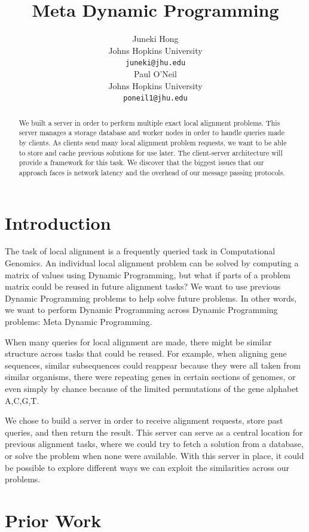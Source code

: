 \documentclass[12pt]{article}
\title{Meta Dynamic Programming}
\author{Juneki Hong \\
  Johns Hopkins University \\
  {\tt juneki@jhu.edu} \\\And
  Paul O'Neil \\
  Johns Hopkins University \\
  {\tt poneil1@jhu.edu} \\}
\date{}
\begin{document}
\maketitle
\begin{abstract}
  We built a server in order to perform multiple exact local alignment problems. This server manages a storage database and worker nodes in order to handle queries made by clients. As clients send many local alignment problem requests, we want to be able to store and cache previous solutions for use later. The client-server architecture will provide a framework for this task. We discover that the biggest issues that our approach faces is network latency and the overhead of our message passing protocols. 
\end{abstract}


\section{Introduction}
The task of local alignment is a frequently queried task in Computational Genomics. 
An individual local alignment problem can be solved by computing a matrix of values using Dynamic Programming, but what if parts of a problem matrix could be reused in future alignment tasks? We want to use previous Dynamic Programming problems to help solve future problems. In other words, we want to perform Dynamic Programming across Dynamic Programming problems: Meta Dynamic Programming.

When many queries for local alignment are made, there might be similar structure across tasks that could be reused. For example, when aligning gene sequences, similar subsequences could reappear because they were all taken from similar organisms, there were repeating genes in certain sections of genomes, or even simply by chance because of the limited permutations of the gene alphabet A,C,G,T.

We chose to build a server in order to receive alignment requests, store past queries, and then return the result. This server can serve as a central location for previous alignment tasks, where we could try to fetch a solution from a database, or solve the problem when none were available. With this server in place, it could be possible to explore different ways we can exploit the similarities across our problems.
 



\section{Prior Work}
\end{document}
